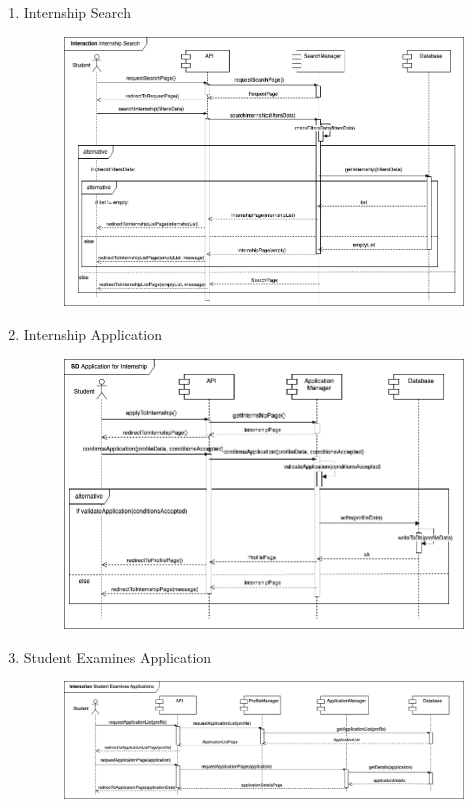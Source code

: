 \begin{enumerate}
    \newpage
    \item Internship Search
    \begin{figure}[h!]
            \centering  \includegraphics[width=1\textwidth]{DD/Images/Interactions/INT05_InternshipSearch.drawio.png}
            \label{fig:ComponentViewDiagram}
    \end{figure}

    \newpage
    \item Internship Application
    \begin{figure}[h!]
            \centering  \includegraphics[width=1\textwidth]{DD/Images/Interactions/INT06_InternshipApplication.drawio.png}
            \label{fig:ComponentViewDiagram}
    \end{figure}

    \newpage
    \item Student Examines Application
    \begin{figure}[h!]
            \centering  \includegraphics[width=1\textwidth]{DD/Images/Interactions/INT07_StudentExaminesApplications.drawio.png}
            \label{fig:ComponentViewDiagram}
    \end{figure}


\end{enumerate}
